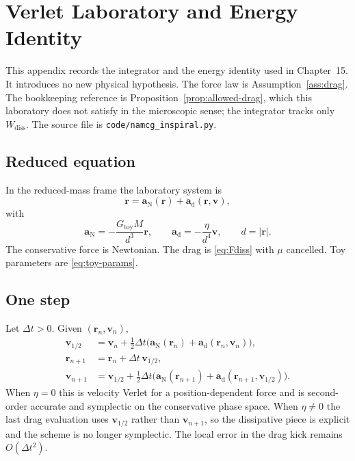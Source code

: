 \chapter{Verlet Laboratory and Energy Identity}
\label{app:integrator}

This appendix records the integrator and the energy identity used
in Chapter~15. It introduces no new physical hypothesis. The force
law is Assumption~\ref{ass:drag}. The bookkeeping reference is
Proposition~\ref{prop:allowed-drag}, which this laboratory does not
satisfy in the microscopic sense; the integrator tracks only
\(W_{\mathrm{diss}}\). The source file is
\texttt{code/namcg\_inspiral.py}.

\section{Reduced equation}
\label{sec:appC-ode}

In the reduced-mass frame the laboratory system is
\begin{equation}
  \label{eq:appC-ode}
  \ddot{\mathbf{r}}
  =\mathbf{a}_{\mathrm{N}}(\mathbf{r})
   +\mathbf{a}_{\mathrm{d}}(\mathbf{r},\mathbf{v}),
\end{equation}
with
\begin{equation}
  \label{eq:appC-acc}
  \mathbf{a}_{\mathrm{N}}
  =-\frac{G_{\mathrm{toy}}M}{d^{3}}\mathbf{r},
  \qquad
  \mathbf{a}_{\mathrm{d}}
  =-\frac{\eta}{d^{4}}\mathbf{v},
  \qquad
  d=|\mathbf{r}|.
\end{equation}
The conservative force is Newtonian. The drag is
\eqref{eq:Fdiss} with \(\mu\) cancelled. Toy parameters are
\eqref{eq:toy-params}.

\section{One step}
\label{sec:appC-step}

Let \(\Delta t>0\). Given \((\mathbf{r}_n,\mathbf{v}_n)\),
\begin{equation}
  \label{eq:appC-verlet}
  \begin{aligned}
    \mathbf{v}_{1/2}
    &=\mathbf{v}_n
      +\tfrac12\Delta t
       \bigl(
         \mathbf{a}_{\mathrm{N}}(\mathbf{r}_n)
         +\mathbf{a}_{\mathrm{d}}(\mathbf{r}_n,\mathbf{v}_n)
       \bigr),\\
    \mathbf{r}_{n+1}
    &=\mathbf{r}_n+\Delta t\,\mathbf{v}_{1/2},\\
    \mathbf{v}_{n+1}
    &=\mathbf{v}_{1/2}
      +\tfrac12\Delta t
       \bigl(
         \mathbf{a}_{\mathrm{N}}(\mathbf{r}_{n+1})
         +\mathbf{a}_{\mathrm{d}}(\mathbf{r}_{n+1},\mathbf{v}_{1/2})
       \bigr).
  \end{aligned}
\end{equation}
When \(\eta=0\) this is velocity Verlet for a position-dependent
force and is second-order accurate and symplectic on the
conservative phase space. When \(\eta\neq 0\) the last drag
evaluation uses \(\mathbf{v}_{1/2}\) rather than
\(\mathbf{v}_{n+1}\), so the dissipative piece is explicit and
the scheme is no longer symplectic. The local error in the drag
kick remains \(O(\Delta t^{2})\).

